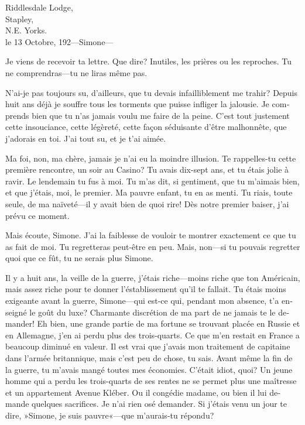 \begin{french}
	\begin{letter}
		\vspace{-1em}
	\end{letter}

	\begin{mail}{Riddlesdale Lodge,\\Stapley,\\N\@.E\@. Yorks.\\le 13 Octobre, 192—}{Simone---}
	
	Je viens de recevoir ta lettre. Que dire? Inutiles, les prières ou les reproches. Tu ne comprendras—tu ne liras même pas.

N'ai-je pas toujours su, d'ailleurs, que tu devais infailliblement me trahir? Depuis huit ans déjà je souffre tous les torments que puisse infliger la jalousie. Je comprends bien que tu n'as jamais voulu me faire de la peine. C'est tout justement cette insouciance, cette légèreté, cette façon séduisante d'être malhonnête, que j'adorais en toi. J'ai tout su, et je t'ai aimée.

Ma foi, non, ma chère, jamais je n'ai eu la moindre illusion. Te rappelles-tu cette première rencontre, un soir au Casino? Tu avais dix-sept ans, et tu étais jolie à ravir. Le lendemain tu fus à moi. Tu m'as dit, si gentiment, que tu m'aimais bien, et que j'étais, moi, le premier. Ma pauvre enfant, tu en as menti. Tu riais, toute seule, de ma naïveté—il y avait bien de quoi rire! Dès notre premier baiser, j'ai prévu ce moment.

Mais écoute, Simone. J'ai la faiblesse de vouloir te montrer exactement ce que tu as fait de moi. Tu regretteras peut-être en peu. Mais, non—si tu pouvais regretter quoi que ce fût, tu ne serais plus Simone.

Il y a huit ans, la veille de la guerre, j'étais riche—moins riche que ton Américain, mais assez riche pour te donner l'éstablissement qu'il te fallait. Tu étais moins exigeante avant la guerre, Simone—qui est-ce qui, pendant mon absence, t'a enseigné le goût du luxe? Charmante discrétion de ma part de ne jamais te le demander! Eh bien, une grande partie de ma fortune se trouvant placée en Russie et en Allemagne, j'en ai perdu plus des trois-quarts. Ce que m'en restait en France a beaucoup diminué en valeur. Il est vrai que j'avais mon traitement de capitaine dans l'armée britannique, mais c'est peu de chose, tu sais. Avant même la fin de la guerre, tu m'avais mangé toutes mes économies. C'était idiot, quoi? Un jeune homme qui a perdu les trois-quarts de ses rentes ne se permet plus une maîtresse et un appartement Avenue Kléber. Ou il congédie madame, ou bien il lui demande quelques sacrifices. Je n'ai rien osé demander. Si j'étais venu un jour te dire, »Simone, je suis pauvre«—que m'aurais-tu répondu?


\end{mail}
\end{french}
